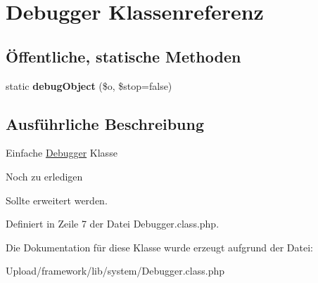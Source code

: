 \hypertarget{class_debugger}{}\section{Debugger Klassenreferenz}
\label{class_debugger}
\subsection*{Öffentliche, statische Methoden}
\begin{DoxyCompactItemize}
\item 
\mbox{\label{class_debugger_aff71315b8d743d8395bc454117f2dcbd}} 
static {\bfseries debug\+Object} (\$o, \$stop=false)
\end{DoxyCompactItemize}


\subsection{Ausführliche Beschreibung}
Einfache \mbox{\hyperlink{class_debugger}{Debugger}} Klasse \begin{DoxyRefDesc}{Noch zu erledigen}
\item[\mbox{\hyperlink{todo__todo000001}{Noch zu erledigen}}]Sollte erweitert werden. \end{DoxyRefDesc}


Definiert in Zeile 7 der Datei Debugger.\+class.\+php.



Die Dokumentation für diese Klasse wurde erzeugt aufgrund der Datei\+:\begin{DoxyCompactItemize}
\item 
Upload/framework/lib/system/Debugger.\+class.\+php\end{DoxyCompactItemize}
